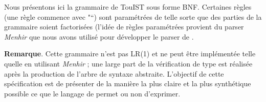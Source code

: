 
\noindent Nous présentons ici la grammaire de TouIST sous forme BNF. Certaines règles (une règle commence avec "\mdcode{::=}\textquotedblleft{}) sont paramétrées de telle sorte que des parties de la grammaire soient factorisées (l'idée de règles paramétrées provient du parser \emph{Menhir} que nous avons utilisé pour développer le parser de \touist.%

\noindent\textbf{Remarque}.
Cette grammaire n'est pas LR(1) et ne peut être implémentée telle quelle en utilisant \emph{Menhir} ; une large part de la vérification de type est réalisée après la production de l'arbre de syntaxe abstraite. L'objectif de cette spécification est de présenter de la manière la plus claire et la plus synthétique possible ce que le langage de \touist permet ou non d'exprimer.%

